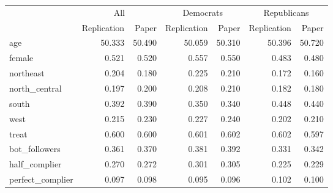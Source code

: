 \begin{table}[ht]
\centering
\begin{tabular}{lrrrrrr}
  \hline
  & \multicolumn{2}{c}{All} & \multicolumn{2}{c}{Democrats} & \multicolumn{2}{c}{Republicans} \\ \cmidrule(lr){2-3} \cmidrule(lr){4-5} \cmidrule(lr){6-7} & Replication & Paper  & Replication & Paper  & Replication & Paper \\ \hline
age & 50.333 & 50.490 & 50.059 & 50.310 & 50.396 & 50.720 \\ 
  female & 0.521 & 0.520 & 0.557 & 0.550 & 0.483 & 0.480 \\ 
  northeast & 0.204 & 0.180 & 0.225 & 0.210 & 0.172 & 0.160 \\ 
  north\_central & 0.197 & 0.200 & 0.208 & 0.210 & 0.182 & 0.180 \\ 
  south & 0.392 & 0.390 & 0.350 & 0.340 & 0.448 & 0.440 \\ 
  west & 0.215 & 0.230 & 0.227 & 0.240 & 0.202 & 0.210 \\ 
  treat & 0.600 & 0.600 & 0.601 & 0.602 & 0.602 & 0.597 \\ 
  bot\_followers & 0.361 & 0.370 & 0.381 & 0.392 & 0.331 & 0.342 \\ 
  half\_complier & 0.270 & 0.272 & 0.301 & 0.305 & 0.225 & 0.229 \\ 
  perfect\_complier & 0.097 & 0.098 & 0.095 & 0.096 & 0.102 & 0.100 \\ 
   \hline
\end{tabular}
\end{table}
